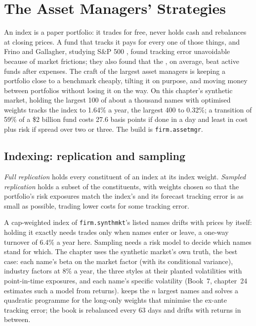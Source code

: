 \chapter{The Asset Managers' Strategies}\label{ch:s1:the-asset-managers-strategies}

An index is a paper portfolio: it trades for free, never holds cash and rebalances at closing prices. A fund that tracks it pays for every one of those
things, and Frino and Gallagher, studying S\&P 500 , found tracking error unavoidable because of market frictions; they also found that the
, on average, beat active funds after expenses. The craft of the largest asset managers is keeping a portfolio close to a benchmark cheaply,
tilting it on purpose, and moving money between portfolios without losing it on the way. On this chapter's synthetic market, holding the largest 100
of about a thousand names with optimised weights tracks the index to 1.64\% a year, the largest 400 to 0.32\%; a transition of 59\% of a \$2 billion fund
costs 27.6 basis points if done in a day and least in cost plus risk if spread over two or three. The build is \texttt{firm.assetmgr}.

\section{Indexing: replication and sampling}

\begin{definition}\label{def:s1:the-asset-managers-strategies:replication}
\emph{Full replication} holds every constituent of an index at its index weight. \emph{Sampled replication} holds a subset of the constituents, with weights chosen so that the portfolio's risk exposures match the index's and its forecast tracking
error is as small as possible, trading lower costs for some tracking error.
\end{definition}

A cap-weighted index of \texttt{firm.synthmkt}'s listed names drifts with prices by itself: holding it exactly needs trades only when names enter or
leave, a one-way turnover of 6.4\% a year here. Sampling needs a risk model to decide which names stand for which. The chapter uses the synthetic
market's own truth, the best case: each name's beta on the market factor (with its conditional variance), industry factors at 8\% a year, the three
styles at their planted volatilities with point-in-time exposures, and each name's specific volatility (Book~7, chapter~24 estimates such a model from
returns).  keeps the $n$ largest names and solves a quadratic programme for the long-only weights
that minimise the ex-ante tracking error; the book is rebalanced every 63 days and drifts with returns in between.

